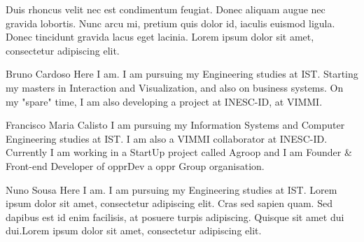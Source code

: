 \documentclass[a4paper,12pt,journal,twoside,compsoc]{PPIEEEtran}
\begin{document}
Duis rhoncus velit nec est condimentum feugiat. Donec aliquam augue nec gravida lobortis. Nunc arcu mi, pretium quis dolor id, iaculis euismod ligula. Donec tincidunt gravida lacus eget lacinia. Lorem ipsum dolor sit amet, consectetur adipiscing elit.

%

% 
\begin{IEEEbiography}{Bruno Cardoso}
Here I am. I am pursuing my Engineering studies at \ac{IST}. Starting my masters in Interaction and Visualization, and also on business systems. On my "spare" time, I am also developing a project at INESC-ID, at VIMMI.
\end{IEEEbiography}
\begin{IEEEbiography}
{Francisco Maria Calisto}
I am pursuing my Information Systems and Computer  Engineering studies at \ac{IST}. I am also a VIMMI collaborator at INESC-ID. Currently I am working in a StartUp project called Agroop and I am Founder \& Front-end Developer of opprDev a oppr Group organisation.
\end{IEEEbiography}
\begin{IEEEbiography}
{Nuno Sousa}
Here I am. I am pursuing my Engineering studies at \ac{IST}. Lorem ipsum dolor sit amet, consectetur adipiscing elit. Cras sed sapien quam. Sed dapibus est id enim facilisis, at posuere turpis adipiscing. Quisque sit amet dui dui.Lorem ipsum dolor sit amet, consectetur adipiscing elit. 
\end{IEEEbiography}
\newpage
\onecolumn
\end{document}
